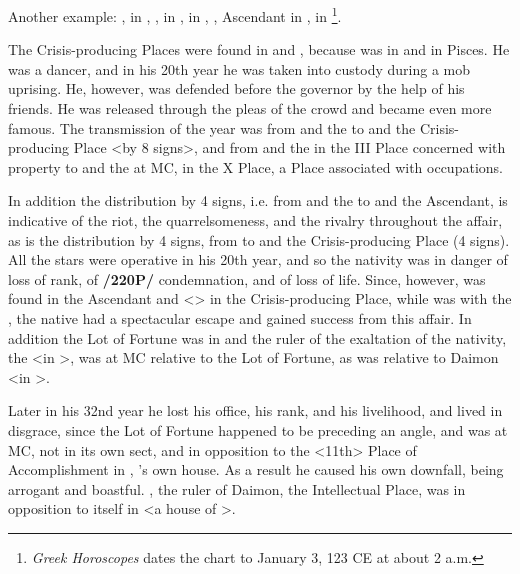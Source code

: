 Another example: \Sun, \Jupiter\xspace in \Capricorn, \Moon, \Saturn\xspace in \Leo, \Mars\xspace in \Pisces, \Venus, Ascendant in \Scorpio, \Mercury\xspace in \Sagittarius\footnote{\textit{Greek Horoscopes} dates the chart to January 3, 123 CE at about 2 a.m.}. 

The Crisis-producing Places were found in \Pisces\xspace and \Scorpio, because \Venus\xspace was in \Scorpio\xspace and \Mars in Pisces. He was a dancer, and in his 20th year he was taken into custody during a mob uprising. He, however, was defended before the governor by the help of his friends. He was released through the pleas of the crowd and became even more famous. The transmission of the year was from \Saturn\xspace and the \Moon\xspace to \Mars\xspace and the Crisis-producing Place <by 8 signs>, and from \Jupiter\xspace and the \Sun\xspace in the III Place concerned with property to \Saturn\xspace and the \Moon\xspace at MC, in the X Place, a Place associated with occupations. 

In addition the distribution by 4 signs, i.e. from \Saturn\xspace and the \Moon\xspace to \Venus\xspace and the Ascendant, is indicative of the riot, the quarrelsomeness, and the rivalry throughout the affair, as is the distribution by 4 signs, from \Mercury\xspace to \Mars\xspace and the Crisis-producing Place (4 signs). All the stars were operative in his 20th year, and so the nativity was in danger of loss of rank, of \textbf{/220P/} condemnation, and of loss of life. Since, however, \Venus\xspace was found in the Ascendant and <\Mars> in the Crisis-producing Place, while \Jupiter\xspace was with the \Sun, the native had a spectacular escape and gained
success from this affair. In addition the Lot of Fortune was in \Aries\xspace and the ruler of the exaltation of the nativity, the \Sun <in \Capricorn>, was at MC relative to the Lot of Fortune, as was \Mars\xspace relative to Daimon <in \Gemini>. 

Later in his 32nd year he lost his office, his rank, and his livelihood, and lived in disgrace, since the Lot of Fortune happened to be preceding an angle, and \Saturn\xspace was at MC, not in its own sect, and in opposition to the <11th> Place of Accomplishment in \Aquarius, \Saturn’s own house. As a result he caused his own downfall, being arrogant and boastful. \Mercury, the ruler of Daimon, the Intellectual Place, was in opposition to itself in \Gemini <a house of \Mercury>.

